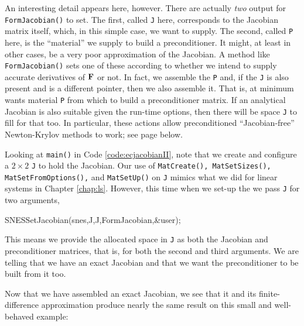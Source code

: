 

An interesting detail appears here, however.  There are actually \emph{two} output \pMats for \texttt{FormJacobian()} to set.  The first, called \texttt{J} here, corresponds to the Jacobian matrix itself, which, in this simple case, we want to supply.  The second, called \texttt{P} here, is the ``material'' we supply to build a preconditioner.  It might, at least in other cases, be a very poor approximation of the Jacobian.  A method like \texttt{FormJacobian()} sets one of these \pMats according to whether we intend to supply accurate derivatives of $\mathbf{F}$ or not.  In fact, we assemble the \pMat \texttt{P} and, if the \pMat \texttt{J} is also present and is a different pointer, then we also assemble it.  That is, at minimum \PETSc wants material \texttt{P} from which to build a preconditioner matrix.  If an analytical Jacobian is also suitable given the run-time options, then there will be space \texttt{J} to fill for that too.  In particular, these actions allow preconditioned ``Jacobian-free'' Newton-Krylov methods to work; see page \pageref{sec:JFNK} below.

Looking at \texttt{main()} in Code \ref{code:ecjacobianII}, note that we create and configure a $2\times 2$ \pMat \texttt{J} to hold the Jacobian.  Our use of \texttt{MatCreate(), MatSetSizes(), MatSetFromOptions(),} and \texttt{MatSetUp()} on \texttt{J} mimics what we did for linear systems in Chapter \ref{chap:ls}.  However, this time when we set-up the \pSNES we pass \texttt{J} for two arguments,
\begin{code}
SNESSetJacobian(snes,J,J,FormJacobian,&user);
\end{code}
This means we provide the allocated space in \texttt{J} as both the Jacobian and preconditioner matrices, that is, for both the second and third \pMat arguments.  We are telling \PETSc that we have an exact Jacobian and that we want the preconditioner to be built from it too.

Now that we have assembled an exact Jacobian, we see that it and its finite-difference approximation produce nearly the same result on this small and well-behaved example:

